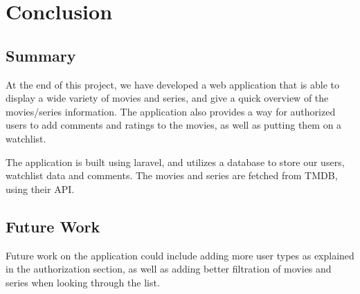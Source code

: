 \section{Conclusion}

\subsection{Summary}
At the end of this project, we have developed a web application
that is able to display a wide variety of movies and series, and give a quick overview of the movies/series information. 
The application also provides a way for authorized users to add comments and ratings to the movies, 
as well as putting them on a watchlist.\newline

The application is built using laravel, and utilizes a database to store our users, 
watchlist data and comments. The movies and series are fetched from TMDB, using their API. \newline

\subsection{Future Work}
Future work on the application could include adding more user types as explained in the authorization section, 
as well as adding better filtration of movies and series when looking through the list. \newline